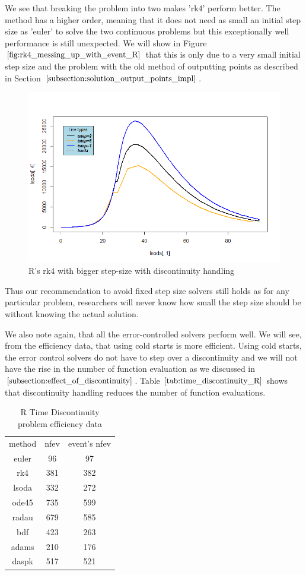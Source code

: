 We see that breaking the problem into two makes 'rk4' perform better. The method has a higher order, meaning that it does not need as small an initial step size as 'euler' to solve the two continuous problems but this exceptionally well performance is still unexpected. We will show in Figure $\ref{fig:rk4_messing_up_with_event_R}$ that this is only due to a very small initial step size and the problem with the old method of outputting points as described in Section $\ref{subsection:solution_output_points_impl}$.

\begin{figure}[h]
	\centering
	\includegraphics[width=0.7\linewidth]{./figures/rk4_messing_up_with_event_R}
	\caption{R's rk4 with bigger step-size with discontinuity handling}
	\label{fig:rk4_messing_up_with_event_R}
\end{figure}

Thus our recommendation to avoid fixed step size solvers still holds as for any particular problem, researchers will never know how small the step size should be without knowing the actual solution.

We also note again, that all the error-controlled solvers perform well. We will see, from the efficiency data, that using cold starts is more efficient. Using cold starts, the error control solvers do not have to step over a discontinuity and we will not have the rise in the number of function evaluation as we discussed in $\ref{subsection:effect_of_discontinuity}$. Table $\ref{tab:time_discontinuity_R}$ shows that discontinuity handling reduces the number of function evaluations. 

\begin{table}[h]
\caption {R Time Discontinuity problem efficiency data} \label{tab:time_discontinuity_R}
\begin{center}
\begin{tabular}{ c c c } 
 method & nfev & event's nfev \\ 
euler & 96  & 97  \\
rk4   & 381 & 382 \\ 
lsoda & 332 & 272 \\
ode45 & 735 & 599 \\
radau & 679 & 585 \\
bdf   & 423 & 263 \\
adams & 210 & 176 \\
daspk & 517 & 521
\end{tabular}
\end{center}
\end{table}

